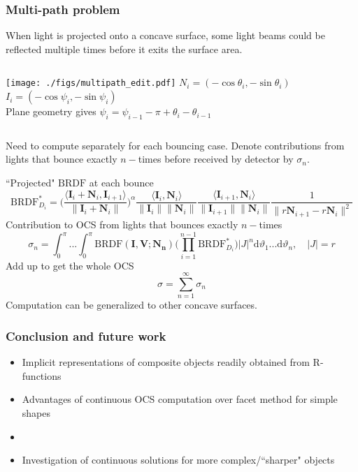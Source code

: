 \documentclass{beamer}
\newcommand{\BRDF}{\mathrm{BRDF}}
\newcommand{\ip}[2]{\langle {#1}, {#2} \rangle}
\begin{document}
\begin{frame}[t]
\frametitle{Multi-path problem}
When light is projected onto a concave surface, some light beams could be reflected multiple times before it exits the surface area. 
\begin{columns}
 \texttt{[image: ./figs/multipath\_edit.pdf]}
 $N_i=(-\cos \theta_i,-\sin\theta_i)$\\ $I_i=(-\cos \psi_i,-\sin\psi_i)$\\ Plane geometry gives $\psi_{i}=\psi_{i-1}-\pi+\theta_i-\theta_{i-1}$
\end{columns}
Need to compute separately for each bouncing case. Denote contributions from lights that bounce exactly $n-$times before received by detector by $\sigma_n$.
\end{frame}

\begin{frame}[t]
``Projected" $\BRDF$ at each bounce
$$\BRDF^*_{D_i}=\Bigg(\frac{\ip{\mathbf{I}_i+\mathbf{N}_i}{\mathbf{I}_{i+1}}}{\|\mathbf{I}_i+\mathbf{N}_i\|}\Bigg)^\alpha\frac{\ip{\mathbf{I}_i}{\mathbf{N}_i}}{\|\mathbf{I}_i\|\|\mathbf{N}_i\|}\frac{\ip{\mathbf{I}_{i+1}}{\mathbf{N}_i}}{\|\mathbf{I}_{i+1}\|\|\mathbf{N}_i\|} \frac{1}{\|r\mathbf{N}_{i+1}-r\mathbf{N}_i\|^2}$$
Contribution to OCS from lights that bounces exactly $n-$times 
\begin{equation*}
\sigma_n =\int_{0}^{\pi}...\int_{0}^{\pi}\BRDF(\mathbf{I},\mathbf{V};\mathbf{N_n})\bigg(\prod_{i=1}^{n-1}\BRDF^*_{D_i}\bigg) |J|^n\mathrm{d}\vartheta_1...\mathrm{d}\vartheta_n , \quad |J|=r
\end{equation*}
Add up to get the whole OCS
$$\sigma=\sum_{n=1}^{\infty} \sigma_n$$
Computation can be generalized to other concave surfaces. 
\end{frame}

\begin{frame}[t]
\frametitle{Conclusion and future work}
\begin{itemize}
\item Implicit representations of composite objects readily obtained from R-functions 
\item Advantages of continuous OCS computation over facet method for simple shapes
\item 
\item Investigation of continuous solutions for more complex/``sharper" objects 
\end{itemize}
\end{frame}
\end{document}
